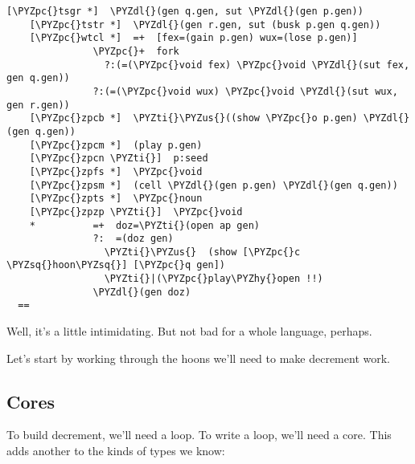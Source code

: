 \begin{framed_shaded}
\begin{Verbatim}[fontsize=\relsize{-2.5},fontseries=b,commandchars=\\\{\}]
    [\PYZpc{}tsgr *]  \PYZdl{}(gen q.gen, sut \PYZdl{}(gen p.gen))
    [\PYZpc{}tstr *]  \PYZdl{}(gen r.gen, sut (busk p.gen q.gen))
    [\PYZpc{}wtcl *]  =+  [fex=(gain p.gen) wux=(lose p.gen)]
               \PYZpc{}+  fork
                 ?:(=(\PYZpc{}void fex) \PYZpc{}void \PYZdl{}(sut fex, gen q.gen))
               ?:(=(\PYZpc{}void wux) \PYZpc{}void \PYZdl{}(sut wux, gen r.gen))
    [\PYZpc{}zpcb *]  \PYZti{}\PYZus{}((show \PYZpc{}o p.gen) \PYZdl{}(gen q.gen))
    [\PYZpc{}zpcm *]  (play p.gen)
    [\PYZpc{}zpcn \PYZti{}]  p:seed
    [\PYZpc{}zpfs *]  \PYZpc{}void
    [\PYZpc{}zpsm *]  (cell \PYZdl{}(gen p.gen) \PYZdl{}(gen q.gen))
    [\PYZpc{}zpts *]  \PYZpc{}noun
    [\PYZpc{}zpzp \PYZti{}]  \PYZpc{}void
    *          =+  doz=\PYZti{}(open ap gen)
               ?:  =(doz gen)
                 \PYZti{}\PYZus{}  (show [\PYZpc{}c \PYZsq{}hoon\PYZsq{}] [\PYZpc{}q gen])
                 \PYZti{}|(\PYZpc{}play\PYZhy{}open !!)
               \PYZdl{}(gen doz)
  ==
\end{Verbatim}
\end{framed_shaded}
Well, it's a little intimidating.  But not bad for a whole
language, perhaps.

Let's start by working through the hoons we'll need to make 
decrement work.

\subsection{Cores}

To build decrement, we'll need a loop.  To write a loop, we'll
need a core.  This adds another to the kinds of types we know:

